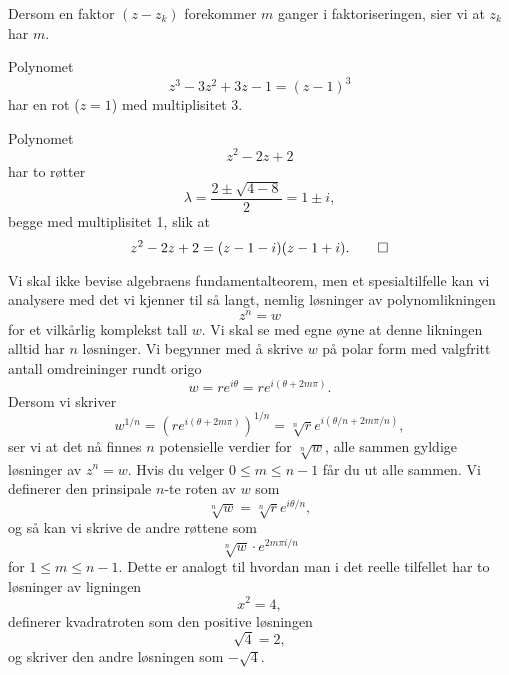 Dersom en faktor $(z-z_k)$  forekommer $m$ ganger i faktoriseringen, 
sier vi at $z_k$ har  $m$.
\begin{ex}
Polynomet 
\[
z^3-3z^2+3z-1=(z-1)^3
\]
har en rot ($z=1$) med multiplisitet 3.
\end{ex}

\begin{ex}
Polynomet 
\[
z^2-2z+2
\]
har to røtter 
\[
\lambda=\frac{2\pm\sqrt{4-8}}{2}=1\pm i,
\] 
begge med multiplisitet 1, slik at 
\[
z^2-2z+2=(z-1-i)(z-1+i).\qedhere
\]
\end{ex}


Vi skal ikke bevise algebraens fundamentalteorem,
men et spesialtilfelle kan vi analysere med det vi kjenner til så langt, 
nemlig løsninger av polynomlikningen
\[
z^n=w
\]
for et vilkårlig komplekst tall $w$. 
Vi skal se med egne øyne at denne likningen alltid har $n$ løsninger. 
Vi begynner med å skrive $w$ på polar form med valgfritt antall omdreininger rundt origo
\[
w = re^{i \theta}=re^{i (\theta+2m\pi)}.
\]
Dersom vi skriver 
\[
w^{1/n} = (re^{i (\theta+2m\pi)})^{1/n}=\sqrt[n]{r}e^{i (\theta/n+2m\pi/n)},
\]
ser vi at det nå finnes $n$ potensielle verdier for $\sqrt[n]{w}$, alle sammen gyldige løsninger av $z^n=w$. 
Hvis du velger $0\leq m \leq n-1$ får du ut alle sammen. 
Vi definerer den prinsipale $n$-te roten av $w$ som
\[
\sqrt[n]{w} = \sqrt[n]{r}e^{i \theta/n},
\]
og så kan vi skrive de andre røttene som 
\[
\sqrt[n]{w} \cdot e^{2m\pi i/n}
\]
for $1 \leq m\leq n-1$.
Dette er analogt til hvordan man i det reelle tilfellet har to løsninger av ligningen
\[
x^2=4,
\]
definerer kvadratroten som den positive løsningen
\[
\sqrt{4}=2,
\]
og skriver den andre løsningen som $-\sqrt{4}$.


